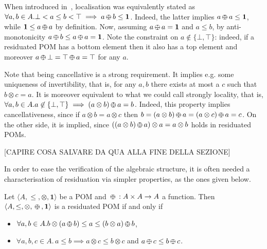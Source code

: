 \documentclass{llncs}
\def\1{{\mathbf 1}}
\def\monid{{\mathbf 0}}
\def\1{{\mathbf 1}}
\def\monop{\otimes}
\def\odiv{\, {\ominus\hspace{-7.7pt} \div} \,}
\def\monid{\mathbf{1}}
\begin{document}
\begin{remark}
When introduced in~\cite[Def.~2.4]{ipl17}, localisation was equivalently stated as 
$\forall a, b \in A. \bot < a \leq b<\top \implies a \odiv b \leq \1$.
Indeed, the latter implies $a \odiv a \leq \1$, while  $\1 \leq a \odiv a$
by definition. Now, assuming $a \odiv a = \1$ and $a \leq b$, 
by anti-monotonicity $a \odiv b \leq a \odiv a = \1$.
Note the constraint on $a \not \in \{\bot,\top\}$: indeed, if a residuated POM 
has a bottom element then it also has a top element and moreover 
$a \odiv \bot = \top \odiv a = \top$ for any  $a$.

Note that being cancellative is a strong requirement. It implies e.g. 
some uniqueness of invertibility, that is, for any $a, b$ there exists 
at most a $c$ such that $b\otimes c = a$.
It is moreover equivalent to what we could call strongly locality,
that is, $\forall a, b \in A. a \not \in \{\bot,\top\} \implies (a \otimes b) \odiv a = b$. 
Indeed, this property implies cancellativeness, since if $a \otimes b = a \otimes c$ 
then $b = (a \otimes b) \odiv a = (a \otimes c) \odiv a = c$. On the other side,
it is implied, since 
$((a \otimes b) \odiv a)\otimes a = a \otimes b$ holds in residuated POMs.
\end{remark}


[CAPIRE COSA SALVARE DA QUA ALLA FINE DELLA SEZIONE]

In order to ease the verification of the algebraic structure, it is often needed
a characterisation of residuation via simpler properties,
as the ones given below.

\begin{lemma}
\label{mono}
Let $\langle A, \leq, \monop, \monid \rangle$ be a POM  and
	$\odiv: A \times A \rightarrow A$ a function. Then $\langle A, \leq, \monop, \odiv, \monid \rangle$ is a residuated POM if and only if
	\begin{itemize}
		\item $\forall a, b \in A. b \monop (a \odiv b) \leq a \leq (b \monop a) \odiv b$,
		\item $\forall a, b, c \in A.\, a \leq b \implies a \otimes c \leq b \otimes c$ and $a\odiv c \leq b \odiv c$.
\end{itemize}
\end{lemma}



\end{document}
